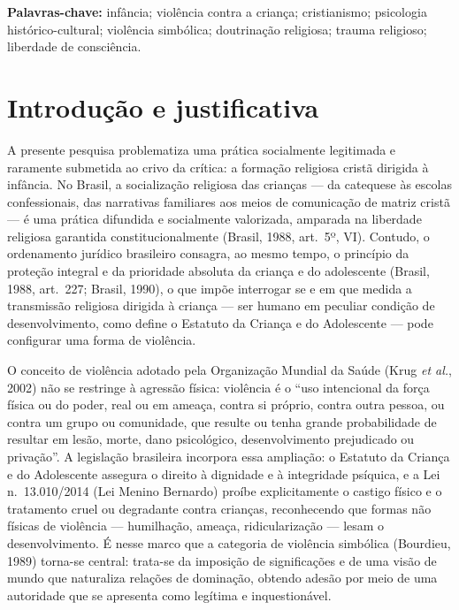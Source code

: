 \documentclass[
    a4paper,
    12pt,
    oneside,
    section=TITLE,
    brazilian,
    english
]{abntex2}
\begin{document}
\noindent\textbf{Palavras-chave:} infância; violência contra a criança; cristianismo; psicologia histórico-cultural; violência simbólica; doutrinação religiosa; trauma religioso; liberdade de consciência.

\newpage

\section{Introdução e justificativa}

A presente pesquisa problematiza uma prática socialmente legitimada e raramente submetida ao crivo da crítica: a formação religiosa cristã dirigida à infância. No Brasil, a socialização religiosa das crianças --- da catequese às escolas confessionais, das narrativas familiares aos meios de comunicação de matriz cristã --- é uma prática difundida e socialmente valorizada, amparada na liberdade religiosa garantida constitucionalmente (Brasil, 1988, art.~5º, VI). Contudo, o ordenamento jurídico brasileiro consagra, ao mesmo tempo, o princípio da proteção integral e da prioridade absoluta da criança e do adolescente (Brasil, 1988, art.~227; Brasil, 1990), o que impõe interrogar se e em que medida a transmissão religiosa dirigida à criança --- ser humano em peculiar condição de desenvolvimento, como define o Estatuto da Criança e do Adolescente --- pode configurar uma forma de violência.

O conceito de violência adotado pela Organização Mundial da Saúde (Krug \emph{et al.}, 2002) não se restringe à agressão física: violência é o \enquote{uso intencional da força física ou do poder, real ou em ameaça, contra si próprio, contra outra pessoa, ou contra um grupo ou comunidade, que resulte ou tenha grande probabilidade de resultar em lesão, morte, dano psicológico, desenvolvimento prejudicado ou privação}. A legislação brasileira incorpora essa ampliação: o Estatuto da Criança e do Adolescente assegura o direito à dignidade e à integridade psíquica, e a Lei n.~13.010/2014 (Lei Menino Bernardo) proíbe explicitamente o castigo físico e o tratamento cruel ou degradante contra crianças, reconhecendo que formas não físicas de violência --- humilhação, ameaça, ridicularização --- lesam o desenvolvimento. É nesse marco que a categoria de violência simbólica (Bourdieu, 1989) torna-se central: trata-se da imposição de significações e de uma visão de mundo que naturaliza relações de dominação, obtendo adesão por meio de uma autoridade que se apresenta como legítima e inquestionável.
\end{document}
